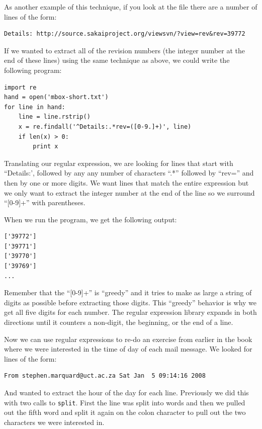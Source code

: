 \documentclass[11pt]{book}
\begin{document}
As another example of this technique, if 
you look at the file there are a number of lines of the form:

\beforeverb
\begin{verbatim}
Details: http://source.sakaiproject.org/viewsvn/?view=rev&rev=39772
\end{verbatim}
\afterverb
%
If we wanted to extract all of the revision numbers (the integer number at the end of these lines) using the same technique as above,  we could write the following program:

\beforeverb
\begin{verbatim}
import re
hand = open('mbox-short.txt')
for line in hand:
    line = line.rstrip()
    x = re.findall('^Details:.*rev=([0-9.]+)', line)
    if len(x) > 0:
        print x
\end{verbatim}
\afterverb
%
Translating our regular expression, we are looking for lines that start with ``Details:', followed by any any number of characters ``.*'' followed by ``rev='' and then by one or more digits.   We want lines that match the entire expression but we only want to extract the integer number at the end of the line so we surround ``[0-9]+'' with parentheses.  

When we run the program, we get the following output:

\beforeverb
\begin{verbatim}
['39772']
['39771']
['39770']
['39769']
...
\end{verbatim}
\afterverb
%
Remember that the ``[0-9]+'' is ``greedy'' and it tries to make as large a string of digits as possible before extracting those digits.  This ``greedy'' behavior is why we get all five digits for each number.  The regular expression library expands in both directions until it counters a non-digit, the beginning, or the end of a line.

Now we can use regular expressions to re-do an exercise from earlier in the book where we were interested in the time of day of each mail message.   We looked for lines of the form:

\beforeverb
\begin{verbatim}
From stephen.marquard@uct.ac.za Sat Jan  5 09:14:16 2008
\end{verbatim}
\afterverb
%
And wanted to extract the hour of the day for each line.  Previously we did this with two calls to {\tt split}.  First the line was split into words and then we pulled out the fifth word and split it again on the colon character to pull out the two characters we were interested in.
\end{document}
